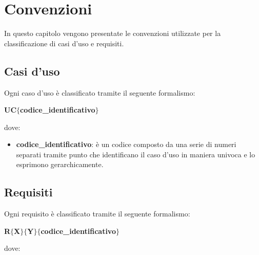 \chapter{Convenzioni} \label{convenzioni}

In questo capitolo vengono presentate le convenzioni utilizzate per la classificazione di casi d'uso e requisiti.

\section{Casi d'uso}

Ogni caso d'uso è classificato tramite il seguente formalismo:

                \begin{center}
                    \textbf{UC$\{$codice\_identificativo$\}$}
                \end{center}

            dove:

                \begin{itemize}
                    \item \textbf{codice\_identificativo}: è un codice composto da una serie di numeri separati tramite
                    punto che identificano il caso d'uso in maniera univoca e lo esprimono gerarchicamente.
                \end{itemize}

\section{Requisiti}

Ogni requisito è classificato tramite il seguente formalismo:

                \begin{center}
                    \textbf{R$\{$X$\}$$\{$Y$\}$$\{$codice\_identificativo$\}$}
                \end{center}

            dove:

